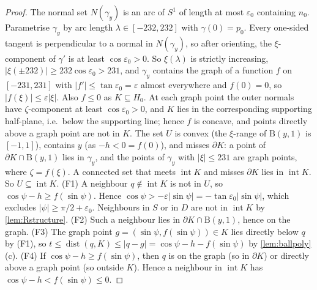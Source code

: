 \documentclass[11pt]{amsart}
\theoremstyle{definition}
\theoremstyle{remark}
\newcommand{\eps}{\varepsilon}
\newcommand{\dist}{\operatorname{dist}}
\newcommand{\Dd}{\mathrm{B}}      %
\begin{document}
\begin{proof}
The normal set $N(\gamma_y)$ is an arc of $S^1$ of length at most $\eps_0$ containing $n_0$. Parametrise $\gamma_y$ by arc length $\lambda\in[-232,232]$ with $\gamma(0)=p_0$. Every one-sided tangent is perpendicular to a normal in $N(\gamma_y)$, so after orienting, the $\xi$-component of $\gamma'$ is at least $\cos\eps_0>0$. So $\xi(\lambda)$ is strictly increasing, $|\xi(\pm232)|\ge232\cos\eps_0>231$, and $\gamma_y$ contains the graph of a function $f$ on $[-231,231]$ with $|f'|\le\tan\eps_0=\eps$ almost everywhere and $f(0)=0$, so $|f(\xi)|\le\eps|\xi|$. Also $f\le0$ as $K\subseteq H_0$. At each graph point the outer normals have $\zeta$-component at least $\cos\eps_0>0$, and $K$ lies in the corresponding supporting half-plane, i.e.\ below the supporting line; hence $f$ is concave, and points directly above a graph point are not in $K$. The set $U$ is convex (the $\xi$-range of $\Dd(y,1)$ is $[-1,1]$), contains $y$ (as $-h<0=f(0)$), and misses $\partial K$: a point of $\partial K\cap\Dd(y,1)$ lies in $\gamma_y$, and the points of $\gamma_y$ with $|\xi|\le231$ are graph points, where $\zeta=f(\xi)$. A connected set that meets $\operatorname{int}K$ and misses $\partial K$ lies in $\operatorname{int}K$. So $U\subseteq\operatorname{int}K$.
(F1) A neighbour $q\notin\operatorname{int}K$ is not in $U$, so $\cos\psi-h\ge f(\sin\psi)$. Hence $\cos\psi>-\eps|\sin\psi|=-\tan\eps_0|\sin\psi|$, which excludes $|\psi|\ge\pi/2+\eps_0$. Neighbours in $S$ or in $D$ are not in $\operatorname{int}K$ by \cref{lem:Rstructure}.
(F2) Such a neighbour lies in $\partial K\cap\Dd(y,1)$, hence on the graph.
(F3) The graph point $g=(\sin\psi,f(\sin\psi))\in K$ lies directly below $q$ by (F1), so $t\le\dist(q,K)\le|q-g|=\cos\psi-h-f(\sin\psi)$ by \cref{lem:ballpoly}(c).
(F4) If $\cos\psi-h\ge f(\sin\psi)$, then $q$ is on the graph (so in $\partial K$) or directly above a graph point (so outside $K$). Hence a neighbour in $\operatorname{int}K$ has $\cos\psi-h<f(\sin\psi)\le0$.
\end{proof}
\end{document}
